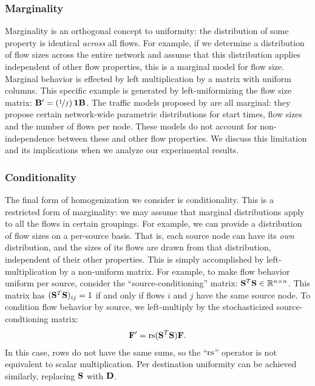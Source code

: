 \documentclass[twocolumn,final]{svjour3}
\begin{document}
\subsubsection{Marginality}

Marginality is an orthogonal concept to uniformity:
the distribution of some property is identical \textit{across} all flows.
For example, if we determine a distribution of flow sizes across the entire network and assume that this distribution applies independent of other flow properties, this is a marginal model for flow size.
Marginal behavior is effected by left multiplication by a matrix with uniform columns.
This specific example is generated by left-uniformizing the flow size matrix:
$\mathbf{B}' = (\nicefrac{1}{f})\,\mathbf{1}\mathbf{B}$.
The traffic models proposed by {\FHC} are all marginal:
they propose certain network-wide parametric distributions for start times, flow sizes and the number of flows per node.
These models do not account for non-independence between these and other flow properties.
We discuss this limitation and its implications when we analyze our experimental results.

\subsubsection{Conditionality}

The final form of homogenization we consider is conditionality.
This is a restricted form of marginality:
we may assume that marginal distributions apply to all the flows in certain groupings.
For example, we can provide a distribution of flow sizes on a per-source basis.
That is, each source node can have its \textit{own} distribution, and the sizes of its flows are drawn from that distribution, independent of their other properties.
This is simply accomplished by left-multiplication by a non-uniform matrix.
For example, to make flow behavior uniform per source, consider the ``source-conditioning'' matrix:
${\mathbf{S}}^T\mathbf{S} \in \mathbb{R}^{n \times n}$.
This matrix has $({\mathbf{S}}^T\mathbf{S})_{ij} = 1$ if and only if flows $i$ and $j$ have the same source node.
To condition flow behavior by source, we left-multiply by the stochasticized source-condtioning matrix:
\begin{align}
  \mathbf{F}'= \text{rs}({\mathbf{S}}^T\mathbf{S})\mathbf{F}.
\end{align}
In this case, rows do not have the same sums, so the ``$\text{rs}$'' operator is not equivalent to scalar multiplication.
Per destination uniformity can be achieved similarly, replacing $\mathbf{S}$ with $\mathbf{D}$.
\end{document}
